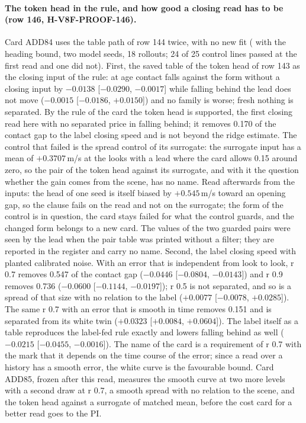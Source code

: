 \paragraph{The token head in the rule, and how good a closing read has to be (row 146, H-V8F-PROOF-146).} Card ADD84 uses the table path of row 144 twice, with no new fit ( with the heading bound, two model seeds, 18 rollouts; 24 of 25 control lines passed at the first read and one did not). First, the saved table of the token head of row 143 as the closing input of the rule: at age contact falls against the form without a closing input by $-0.0138$ [$-0.0290$, $-0.0017$] while falling behind the lead does not move ($-0.0015$ [$-0.0186$, $+0.0150$]) and no family is worse; fresh nothing is separated. By the rule of the card the token head is supported, the first closing read here with no separated price in falling behind; it removes 0.170 of the contact gap to the label closing speed and is not beyond the ridge estimate. The control that failed is the spread control of its surrogate: the surrogate input has a mean of $+0.3707$\,m/s at the looks with a lead where the card allows 0.15 around zero, so the pair of the token head against its surrogate, and with it the question whether the gain comes from the scene, has no name. Read afterwards from the inputs: the head of one seed is itself biased by $+0.545$\,m/s toward an opening gap, so the clause fails on the read and not on the surrogate; the form of the control is in question, the card stays failed for what the control guards, and the changed form belongs to a new card. The values of the two guarded pairs were seen by the lead when the pair table was printed without a filter; they are reported in the register and carry no name. Second, the label closing speed with planted calibrated noise. With an error that is independent from look to look, r 0.7 removes 0.547 of the contact gap ($-0.0446$ [$-0.0804$, $-0.0143$]) and r 0.9 removes 0.736 ($-0.0600$ [$-0.1144$, $-0.0197$]); r 0.5 is not separated, and so is a spread of that size with no relation to the label ($+0.0077$ [$-0.0078$, $+0.0285$]). The same r 0.7 with an error that is smooth in time removes 0.151 and is separated from its white twin ($+0.0323$ [$+0.0084$, $+0.0604$]). The label itself as a table reproduces the label-fed rule exactly and lowers falling behind as well ($-0.0215$ [$-0.0455$, $-0.0016$]). The name of the card is a requirement of r 0.7 with the mark that it depends on the time course of the error; since a read over a history has a smooth error, the white curve is the favourable bound. Card ADD85, frozen after this read, measures the smooth curve at two more levels with a second draw at r 0.7, a smooth spread with no relation to the scene, and the token head against a surrogate of matched mean, before the cost card for a better read goes to the PI.

